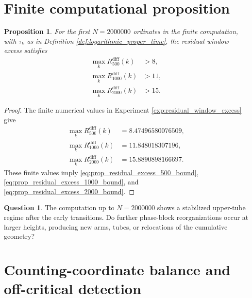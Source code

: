 \documentclass[11pt]{amsart}
\numberwithin{equation}{section}
\theoremstyle{plain}
\newtheorem{proposition}[theorem]{Proposition}
\theoremstyle{definition}
\newtheorem{question}[theorem]{Question}
\theoremstyle{remark}
\newcommand{\diff}{\mathrm{diff}}
\begin{document}
\section{Finite computational proposition}
\label{sec:finite_computational_proposition}

\begin{proposition}
\label{prop:finite_residual_window_excess}
For the first \(N=2000000\) ordinates in the finite computation, with \(\tau_k\) as in Definition \ref{def:logarithmic_proper_time}, the residual window excess satisfies
\begin{align}
\max_k R_{500}^{\diff}(k)
&>
8,
\label{eq:prop_residual_excess_500_bound}
\\
\max_k R_{1000}^{\diff}(k)
&>
11,
\label{eq:prop_residual_excess_1000_bound}
\\
\max_k R_{2000}^{\diff}(k)
&>
15.
\label{eq:prop_residual_excess_2000_bound}
\end{align}
\end{proposition}

\begin{proof}
The finite numerical values in Experiment \ref{exp:residual_window_excess} give
\begin{align}
\max_k R_{500}^{\diff}(k)
&=
8.47496580076509,
\label{eq:proof_prop_500_exact}
\\
\max_k R_{1000}^{\diff}(k)
&=
11.848018307196,
\label{eq:proof_prop_1000_exact}
\\
\max_k R_{2000}^{\diff}(k)
&=
15.8890898166697.
\label{eq:proof_prop_2000_exact}
\end{align}
These finite values imply \eqref{eq:prop_residual_excess_500_bound}, \eqref{eq:prop_residual_excess_1000_bound}, and \eqref{eq:prop_residual_excess_2000_bound}.
\end{proof}

\begin{question}
\label{ques:persistence_further_transitions}
The computation up to \(N=2000000\) shows a stabilized upper-tube regime after the early transitions.  Do further phase-block reorganizations occur at larger heights, producing new arms, tubes, or relocations of the cumulative geometry?
\end{question}




\section{Counting-coordinate balance and off-critical detection}
\label{sec:counting_coordinate_balance_offcritical_detection}
\end{document}
